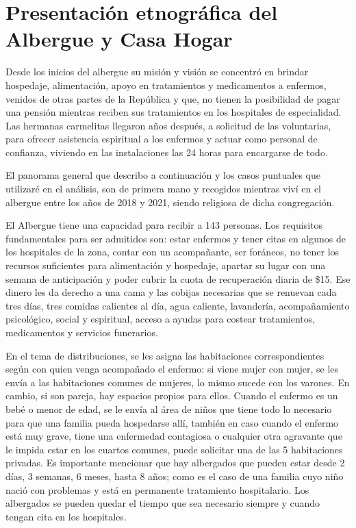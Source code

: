 \documentclass[
  spanish,
  11pt,
  a4paper,
]{scrbook}
\begin{document}
\section*{Presentación etnográfica del Albergue y Casa
Hogar}\label{presentaciuxf3n-etnogruxe1fica-del-albergue-y-casa-hogar}


Desde los inicios del albergue su misión y visión se concentró en
brindar hospedaje, alimentación, apoyo en tratamientos y medicamentos a
enfermos, venidos de otras partes de la República y que, no tienen la
posibilidad de pagar una pensión mientras reciben sus tratamientos en
los hospitales de especialidad. Las hermanas carmelitas llegaron años
después, a solicitud de las voluntarias, para ofrecer asistencia
espiritual a los enfermos y actuar como personal de confianza, viviendo
en las instalaciones las 24 horas para encargarse de todo.

El panorama general que describo a continuación y los casos puntuales
que utilizaré en el análisis, son de primera mano y recogidos mientras
viví en el albergue entre los años de 2018 y 2021, siendo religiosa de
dicha congregación.

El Albergue tiene una capacidad para recibir a 143 personas. Los
requisitos fundamentales para ser admitidos son: estar enfermos y tener
citas en algunos de los hospitales de la zona, contar con un
acompañante, ser foráneos, no tener los recursos suficientes para
alimentación y hospedaje, apartar su lugar con una semana de
anticipación y poder cubrir la cuota de recuperación diaria de \$15. Ese
dinero les da derecho a una cama y las cobijas necesarias que se
renuevan cada tres días, tres comidas calientes al día, agua caliente,
lavandería, acompañamiento psicológico, social y espiritual, acceso a
ayudas para costear tratamientos, medicamentos y servicios funerarios.

En el tema de distribuciones, se les asigna las habitaciones
correspondientes según con quien venga acompañado el enfermo: si viene
mujer con mujer, se les envía a las habitaciones comunes de mujeres, lo
mismo sucede con los varones. En cambio, si son pareja, hay espacios
propios para ellos. Cuando el enfermo es un bebé o menor de edad, se le
envía al área de niños que tiene todo lo necesario para que una familia
pueda hospedarse allí, también en caso cuando el enfermo está muy grave,
tiene una enfermedad contagiosa o cualquier otra agravante que le impida
estar en los cuartos comunes, puede solicitar una de las 5 habitaciones
privadas. Es importante mencionar que hay albergados que pueden estar
desde 2 días, 3 semanas, 6 meses, hasta 8 años; como es el caso de una
familia cuyo niño nació con problemas y está en permanente tratamiento
hospitalario. Los albergados se pueden quedar el tiempo que sea
necesario siempre y cuando tengan cita en los hospitales.
\end{document}
